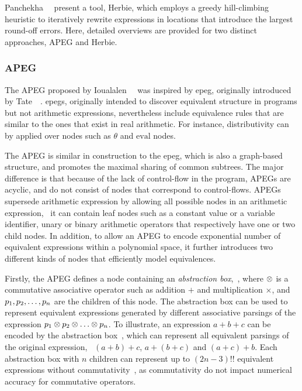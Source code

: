Panchekha~\etal~\cite{panchekha15} present a tool, Herbie, which employs a
greedy hill-climbing heuristic to iteratively rewrite expressions in locations
that introduce the largest round-off errors.  Here, detailed overviews are
provided for two distinct approaches, APEG and Herbie.

\subsubsection{APEG}

The APEG proposed by Ioualalen~\etal~\cite{ioualalen} was inspired by
\gls{epeg}, originally introduced by Tate~\etal~\cite{tate09}\footnotemark[1].
\glspl{epeg}, originally intended to discover equivalent structure in programs
but not arithmetic expressions, nevertheless include equivalence rules
that are similar to the ones that exist in real arithmetic.  For instance,
distributivity can by applied over nodes such as $\theta$ and $\mathrm{eval}$
nodes.

The APEG is similar in construction to the \gls{epeg}, which is also a
graph-based structure, and promotes the maximal sharing of common subtrees.
The major difference is that because of the lack of control-flow in the
program, APEGs are acyclic, and do not consist of nodes that correspond to
control-flows.  APEGs supersede arithmetic expression by allowing all possible
nodes in an arithmetic expression, \ie~it can contain leaf nodes such as a
constant value or a variable identifier, unary or binary arithmetic operators
that respectively have one or two child nodes.  In addition, to allow an APEG
to encode exponential number of equivalent expressions within a polynomial
space, it further introduces two different kinds of nodes that efficiently
model equivalences.

Firstly, the APEG defines a node containing an \emph{abstraction box},
\,, where
$\otimes$ is a commutative associative operator such as addition $+$ and
multiplication $\times$, and $p_1, p_2, \mathellipsis, p_n$ are the children of
this node.  The abstraction box can be used to represent equivalent expressions
generated by different associative parsings of the expression $p_1 \otimes
p_2 \otimes \mathellipsis \otimes p_n$.  To illustrate, an expression $a
+ b + c$ can be encoded by the abstraction box \,, which
can represent all equivalent parsings of the original expression, \ie~$(a
+ b) + c$, $a + (b + c)$ and $(a + c) + b$.  Each abstraction box with $n$
children can represent up to $(2n - 3){!!}$ equivalent expressions without
commutativity~\cite{ioualalen, mouilleron}, as commutativity do not impact
numerical accuracy for commutative operators.

